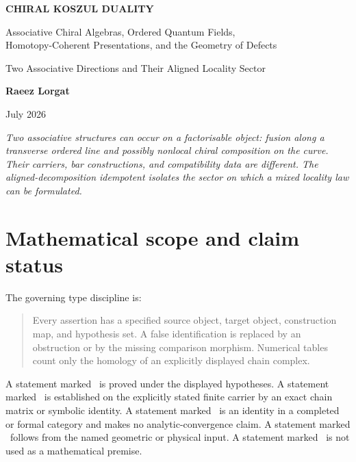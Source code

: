 \hypersetup{pageanchor=false}
\begin{titlepage}
\centering
\vspace*{1.05in}
{\Huge\bfseries\color{ink} CHIRAL KOSZUL DUALITY\par}
\vspace{0.35in}
{\Large\color{deep} Associative Chiral Algebras, Ordered Quantum Fields,\\
Homotopy-Coherent Presentations, and the Geometry of Defects\par}
\vspace{0.28in}
{\large Two Associative Directions and Their Aligned Locality Sector\par}
\vfill
{\Large\bfseries Raeez Lorgat\par}
\vspace{0.18in}
{\large July 2026\par}
\vfill
\begin{minipage}{0.82\textwidth}
\small\itshape
Two associative structures can occur on a factorisable object: fusion along a
transverse ordered line and possibly nonlocal chiral composition on the curve.
Their carriers, bar constructions, and compatibility data are different.  The
aligned-decomposition idempotent isolates the sector on which a mixed locality
law can be formulated.
\end{minipage}
\end{titlepage}
\hypersetup{pageanchor=true}

\chapter*{Mathematical scope and claim status}

The governing type discipline is:
\begin{quote}
Every assertion has a specified source object, target object, construction map,
and hypothesis set.  A false identification is replaced by an obstruction or by
the missing comparison morphism.  Numerical tables count only the homology of
an explicitly displayed chain complex.
\end{quote}
\begin{statusbox}[title={Claim-status convention}]
A statement marked \proved\ is proved under the displayed hypotheses.  A
statement marked \computed\ is established on the explicitly stated finite
carrier by an exact chain matrix or symbolic identity.  A statement marked
\formalstatus\ is an identity in a completed or formal category and makes no
analytic-convergence claim.  A statement marked \conditional\ follows from
the named geometric or physical input.  A statement marked \retracted\ is not
used as a mathematical premise.
\end{statusbox}

